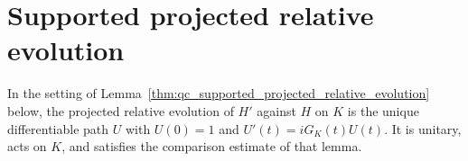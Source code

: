 \section{Supported projected relative evolution}

\begin{definition}
    \label{def:qc_projected_relative_evolution}
    \leanok
    In the setting of Lemma~\ref{thm:qc_supported_projected_relative_evolution}
    below, the projected relative evolution of $H'$ against $H$ on $K$ is the
    unique differentiable path $U$ with $U(0)=1$ and $U'(t)=iG_K(t)U(t)$. It is
    unitary, acts on $K$, and satisfies the comparison estimate of that lemma.
\end{definition}


